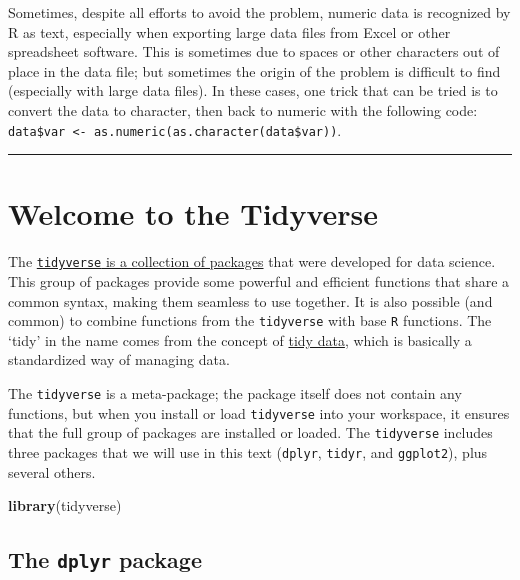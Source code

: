 \documentclass[letterpaper,]{book}
\newenvironment{Shaded}{\begin{snugshade}}{\end{snugshade}}
\newcommand{\KeywordTok}[1]{\textcolor[rgb]{0.13,0.29,0.53}{\textbf{#1}}}
\newcommand{\NormalTok}[1]{#1}
\begin{document}
Sometimes, despite all efforts to avoid the problem, numeric data is recognized by R as text, especially when exporting large data files from Excel or other spreadsheet software. This is sometimes due to spaces or other characters out of place in the data file; but sometimes the origin of the problem is difficult to find (especially with large data files). In these cases, one trick that can be tried is to convert the data to character, then back to numeric with the following code: \texttt{data\$var\ \textless{}-\ as.numeric(as.character(data\$var))}.

\begin{center}\rule{0.5\linewidth}{0.5pt}\end{center}

\hypertarget{welcome-to-the-tidyverse}{%
\chapter{Welcome to the Tidyverse}\label{welcome-to-the-tidyverse}}

The \href{https://www.tidyverse.org/}{\texttt{tidyverse} is a collection of packages} that were developed for data science. This group of packages provide some powerful and efficient functions that share a common syntax, making them seamless to use together. It is also possible (and common) to combine functions from the \texttt{tidyverse} with base \texttt{R} functions. The `tidy' in the name comes from the concept of \href{https://www.jstatsoft.org/index.php/jss/article/view/v059i10/v59i10.pdf}{tidy data}, which is basically a standardized way of managing data.

The \texttt{tidyverse} is a meta-package; the package itself does not contain any functions, but when you install or load \texttt{tidyverse} into your workspace, it ensures that the full group of packages are installed or loaded. The \texttt{tidyverse} includes three packages that we will use in this text (\texttt{dplyr}, \texttt{tidyr}, and \texttt{ggplot2}), plus several others.

\begin{Shaded}
\begin{Highlighting}[]
\KeywordTok{library}\NormalTok{(tidyverse)}
\end{Highlighting}
\end{Shaded}

\hypertarget{the-dplyr-package}{%
\section{\texorpdfstring{The \texttt{dplyr} package}{The dplyr package}}\label{the-dplyr-package}}
\end{document}
